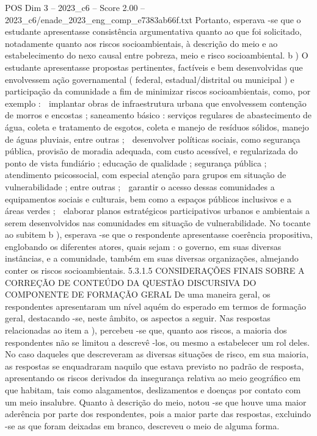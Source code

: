 \begin{textsample}{POS Dim 3 – 2023\_c6 – Score 2.00 – 2023\_c6/enade\_2023\_eng\_comp\_e7383ab66f.txt}
Portanto, esperava -se que o estudante apresentasse consistência argumentativa quanto ao que foi solicitado, notadamente quanto aos riscos socioambientais, à descrição do meio e ao estabelecimento do nexo causal entre pobreza, meio e risco socioambiental. b ) O estudante apresentasse propostas pertinentes, factíveis e bem desenvolvidas que envolvessem ação governamental ( federal, estadual/distrital ou municipal ) e participação da comunidade a fim de minimizar riscos socioambientais, como, por exemplo :  implantar obras de infraestrutura urbana que envolvessem contenção de morros e encostas ; saneamento básico : serviços regulares de abastecimento de água, coleta e tratamento de esgotos, coleta e manejo de resíduos sólidos, manejo de águas pluviais, entre outras ;  desenvolver políticas sociais, como segurança pública, provisão de moradia adequada, com custo acessível, e regularizada do ponto de vista fundiário ; educação de qualidade ; segurança pública ; atendimento psicossocial, com especial atenção para grupos em situação de vulnerabilidade ; entre outras ;  garantir o acesso dessas comunidades a equipamentos sociais e culturais, bem como a espaços públicos inclusivos e a áreas verdes ;  elaborar planos estratégicos participativos urbanos e ambientais a serem desenvolvidos nas comunidades em situação de vulnerabilidade.
No tocante ao subitem b ), esperava -se que o respondente apresentasse coerência propositiva, englobando os diferentes atores, quais sejam : o governo, em suas diversas instâncias, e a comunidade, também em suas diversas organizações, almejando conter os riscos socioambientais. 5.3.1.5 CONSIDERAÇÕES FINAIS SOBRE A CORREÇÃO DE CONTEÚDO DA QUESTÃO DISCURSIVA DO COMPONENTE DE FORMAÇÃO GERAL De uma maneira geral, os respondentes apresentaram um nível aquém do esperado em termos de formação geral, destacando -se, neste âmbito, os aspectos a seguir.
Nas respostas relacionadas ao item a ), percebeu -se que, quanto aos riscos, a maioria dos respondentes não se limitou a descrevê -los, ou mesmo a estabelecer um rol deles.
No caso daqueles que descreveram as diversas situações de risco, em sua maioria, as respostas se enquadraram naquilo que estava previsto no padrão de resposta, apresentando os riscos derivados da insegurança relativa ao meio geográfico em que habitam, tais como alagamentos, deslizamentos e doenças por contato com um meio insalubre.
Quanto à descrição do meio, notou -se que houve uma maior aderência por parte dos respondentes, pois a maior parte das respostas, excluindo -se as que foram deixadas em branco, descreveu o meio de alguma forma.

\end{textsample}
